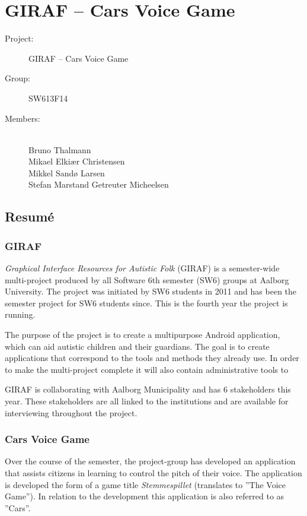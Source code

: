 \documentclass[a4paper,12pt,english]{article}
\begin{document}
\section*{GIRAF -- Cars Voice Game}

\begin{description}
\item[Project:] GIRAF -- Cars Voice Game
\item[Group:] SW613F14
\item[Members:] ~ \\
	Bruno Thalmann \\
	Mikael Elki\ae r Christensen \\
	Mikkel Sand\o{} Larsen \\
	Stefan Marstand Getreuter Micheelsen
\end{description}

\subsection*{Resum\'e}

\subsubsection*{GIRAF}
\textit{Graphical Interface Resources for Autistic Folk} (GIRAF) is a semester-wide multi-project produced by all Software 6th semester (SW6) groups at Aalborg University.
The project was initiated by SW6 students in 2011 and has been the semester project for SW6 students since.
This is the fourth year the project is running.

The purpose of the project is to create a multipurpose Android application, which can aid autistic children and their guardians.
The goal is to create applications that correspond to the tools and methods they already use.
In order to make the multi-project complete it will also contain administrative tools to 

GIRAF is collaborating with Aalborg Municipality and has 6 stakeholders this year.
These stakeholders are all linked to the institutions and are available for interviewing throughout the project.

\subsubsection*{Cars Voice Game}
Over the course of the semester, the project-group has developed an application that assists citizens in learning to control the pitch of their voice.
The application is developed the form of a game title \textit{Stemmespillet} (translates to ''The Voice Game'').
In relation to the development this application is also referred to as ''Cars''.
\end{document}
